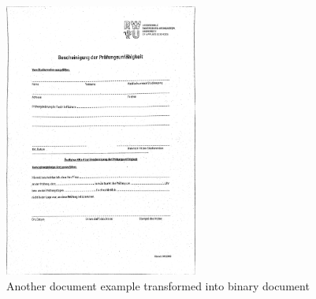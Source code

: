 \documentclass[twocolumn,10pt]{asme2ej}
\begin{document}
\begin{figure}[H]
    \centerline{\includegraphics[width=2.5in]{output/hoch_1_8_adaptive_binary_image_mean.jpg}}
    \caption{Another document example transformed into binary document}
    \label{fig:hoch1_binary}
\end{figure}



















\end{document}
